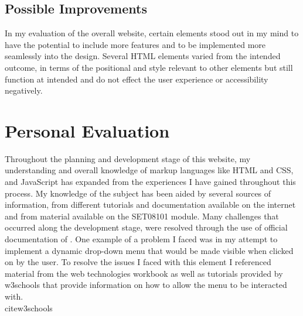 \documentclass[10pt, a4paper]{article}
\begin{document}
	\subsection{Possible Improvements}
	In my evaluation of the overall website, certain elements stood out in my mind to have the potential to include more features and to be implemented more seamlessly into the design. Several HTML elements varied from the intended outcome, in terms of the positional and style relevant to other elements but still function at intended and do not effect the user experience or accessibility negatively. 
	
	
	\section{Personal Evaluation}
	Throughout the planning and development stage of this website, my understanding and overall knowledge of markup languages like HTML and CSS, and JavaScript has expanded from the experiences I have gained throughout this process. My knowledge of the subject has been aided by several sources of information, from different tutorials and documentation available on the internet and from material available on the SET08101 module. Many challenges that occurred along the development stage, were resolved through the use of official documentation of . One example of a problem I faced was in my attempt to implement a dynamic drop-down menu that would be made visible when clicked on by the user. To resolve the issues I faced with this element I referenced material from the web technologies workbook as well as tutorials provided by w3schools that provide information on how to allow the menu to be interacted with. \\cite{w3schools}
	
	
    
	
	
		

		
\end{document}
